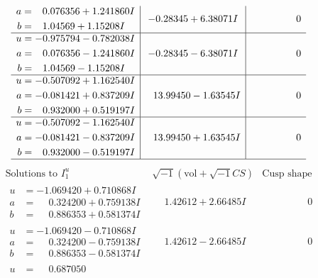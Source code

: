 \documentclass[1p]{elsarticle_modified}
\theoremstyle{definition}
\newcommand{\I}{\sqrt{-1}}
\begin{document}
$$\begin{array}{c|c|c}
\begin{aligned}
a &= \phantom{-}0.076356 + 1.241860 I \\
b &= \phantom{-}1.04569 + 1.15208 I\end{aligned}
 & -0.28345 + 6.38071 I & \phantom{-0.000000 } 0 \\ \hline\begin{aligned}
u &= -0.975794 - 0.782038 I \\
a &= \phantom{-}0.076356 - 1.241860 I \\
b &= \phantom{-}1.04569 - 1.15208 I\end{aligned}
 & -0.28345 - 6.38071 I & \phantom{-0.000000 } 0 \\ \hline\begin{aligned}
u &= -0.507092 + 1.162540 I \\
a &= -0.081421 + 0.837209 I \\
b &= \phantom{-}0.932000 + 0.519197 I\end{aligned}
 & \phantom{-}13.99450 - 1.63545 I & \phantom{-0.000000 } 0 \\ \hline\begin{aligned}
u &= -0.507092 - 1.162540 I \\
a &= -0.081421 - 0.837209 I \\
b &= \phantom{-}0.932000 - 0.519197 I\end{aligned}
 & \phantom{-}13.99450 + 1.63545 I & \phantom{-0.000000 } 0\\
 \hline 
 \end{array}$$\newpage$$\begin{array}{c|c|c}  
\text{Solutions to }I^u_{1}& \I (\text{vol} + \sqrt{-1}CS) & \text{Cusp shape}\\
 \hline 
\begin{aligned}
u &= -1.069420 + 0.710868 I \\
a &= \phantom{-}0.324200 + 0.759138 I \\
b &= \phantom{-}0.886353 + 0.581374 I\end{aligned}
 & \phantom{-}1.42612 + 2.66485 I & \phantom{-0.000000 } 0 \\ \hline\begin{aligned}
u &= -1.069420 - 0.710868 I \\
a &= \phantom{-}0.324200 - 0.759138 I \\
b &= \phantom{-}0.886353 - 0.581374 I\end{aligned}
 & \phantom{-}1.42612 - 2.66485 I & \phantom{-0.000000 } 0 \\ \hline\begin{aligned}
u &= \phantom{-}0.687050\phantom{ +0.000000I} \\

\end{aligned}
\end{array}$$
\end{document}
